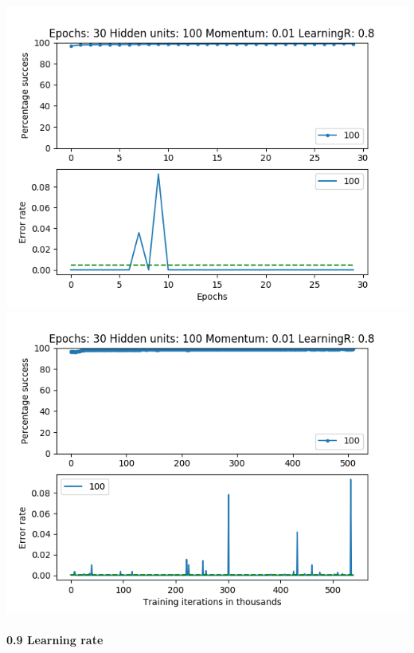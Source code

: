 \documentclass[11pt]{article}
\makeatletter
\def\maxwidth{\ifdim\Gin@nat@width>\linewidth\linewidth
    \else\Gin@nat@width\fi}
\let\Oldincludegraphics\includegraphics
\renewcommand{\includegraphics}[1]{\Oldincludegraphics[width=.8\maxwidth]{#1}}
\makeatother
\begin{document}
\includegraphics{Experiment1/E1_NN_Epoch_Momentum_0.01_30Epochs_100_LR_0.8_Hiddenunits.png}
\includegraphics{Experiment1/E1_NN_Training_Momentum_0.01_30Epochs_100_LR_0.8_Hiddenunits.png}

\hypertarget{learning-rate-8}{%
\paragraph{0.9 Learning rate}\label{learning-rate-8}}
\end{document}
